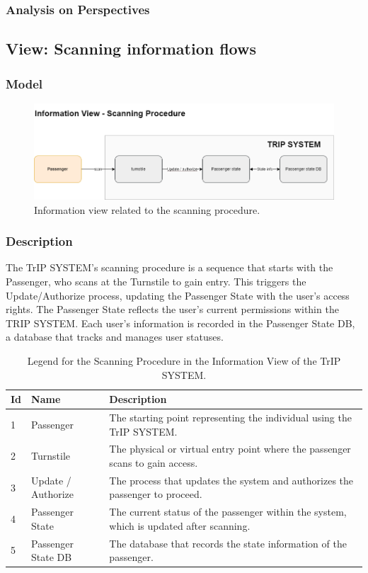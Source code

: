 \subsubsection{Analysis on Perspectives}

\subsection{View: Scanning information flows}
\subsubsection{Model}
\begin{figure}[H]
    \centering
    \includegraphics[width=\textwidth]{drawings/views_final_version/information_view scanning.png}
    \caption{Information view related to the scanning procedure.}
    \label{fig:information_view_scanning}
\end{figure}

\subsubsection{Description}
The TrIP SYSTEM's scanning procedure is a sequence that starts with the Passenger, who scans at the Turnstile to gain entry. This triggers the Update/Authorize process, updating the Passenger State with the user's access rights. The Passenger State reflects the user's current permissions within the TRIP SYSTEM. Each user’s information is recorded in the Passenger State DB, a database that tracks and manages user statuses.

\begin{table}[H]
    \centering
    \caption{Legend for the Scanning Procedure in the Information View of the TrIP SYSTEM.}
    \label{tab:scanning_procedure_legend}
    \begin{tabular}{@{}llp{10cm}@{}}
    \toprule
    \textbf{Id} & \textbf{Name} & \textbf{Description} \\
    \midrule
    1 & Passenger & The starting point representing the individual using the TrIP SYSTEM. \\
    2 & Turnstile & The physical or virtual entry point where the passenger scans to gain access. \\
    3 & Update / Authorize & The process that updates the system and authorizes the passenger to proceed. \\
    4 & Passenger State & The current status of the passenger within the system, which is updated after scanning. \\
    5 & Passenger State DB & The database that records the state information of the passenger. \\
    \bottomrule
\end{tabular}
\end{table}


